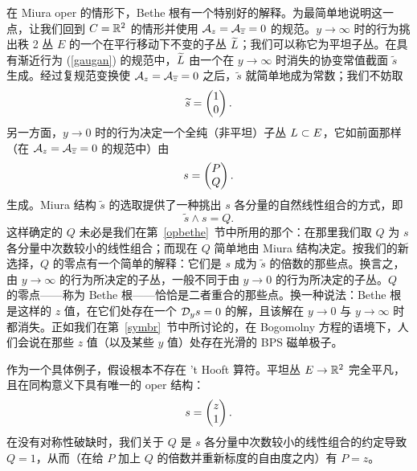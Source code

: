在 Miura oper 的情形下，Bethe 根有一个特别好的解释。为最简单地说明这一点，让我们回到 $C=\R^2$ 的情形并使用 $\A_z=\A_{\bar z}=0$ 的规范。$y\to\infty$ 时的行为挑出秩 2 丛 $E$ 的一个在平行移动下不变的子丛 $\tilde\L$；我们可以称它为平坦子丛。在具有渐近行为 (\ref{gaugan}) 的规范中，$\tilde \L$ 由一个在 $y\to\infty$ 时消失的协变常值截面 $\tilde s$ 生成。经过复规范变换使 $\A_z=\A_{\bar z}=0$ 之后，$\tilde s $ 就简单地成为常数；我们不妨取
\begin{equation}\label{rofor}\tilde s=\begin{pmatrix} 1 \cr 0 \end{pmatrix}.\end{equation}
另一方面，$y\to 0$ 时的行为决定一个全纯（非平坦）子丛 $\L\subset E$，它如前面那样（在 $\A_z=\A_{\bar z}=0$ 的规范中）由
\begin{equation}\label{wagan}s=\begin{pmatrix} P \cr Q\end{pmatrix}.\end{equation}
生成。Miura 结构 $\tilde s$ 的选取提供了一种挑出 $s$ 各分量的自然线性组合的方式，即
\begin{equation}\label{agan}\tilde s \wedge s=Q. \end{equation}
这样确定的 $Q$ 未必是我们在第~\ref{opbethe}~节中所用的那个：在那里我们取 $Q$ 为 $s$ 各分量中次数较小的线性组合；而现在 $Q$ 简单地由 Miura 结构决定。按我们的新选择，$Q$ 的零点有一个简单的解释：它们是 $s$ 成为 $\tilde s$ 的倍数的那些点。换言之，由 $y\to\infty$ 的行为所决定的子丛，一般不同于由 $y\to 0$ 的行为所决定的子丛。$Q$ 的零点——称为 Bethe 根——恰恰是二者重合的那些点。换一种说法：Bethe 根是这样的 $z$ 值，在它们处存在一个 $\D_ys= 0$ 的解，且该解在 $y\to 0$ 与 $y\to\infty$ 时都消失。正如我们在第~\ref{symbr}~节中所讨论的，在 Bogomolny 方程的语境下，人们会说在那些 $z$ 值（以及某些 $y$ 值）处存在光滑的 BPS 磁单极子。


作为一个具体例子，假设根本不存在 't Hooft 算符。平坦丛 $E\to \R^2$ 完全平凡，且在同构意义下具有唯一的 oper 结构：
\begin{equation}\label{only} s=\begin{pmatrix} z \cr 1\end{pmatrix}.\end{equation}
在没有对称性破缺时，我们关于 $Q$ 是 $s$ 各分量中次数较小的线性组合的约定导致 $Q=1$，从而（在给 $P$ 加上 $Q$ 的倍数并重新标度的自由度之内）有 $P=z$。

